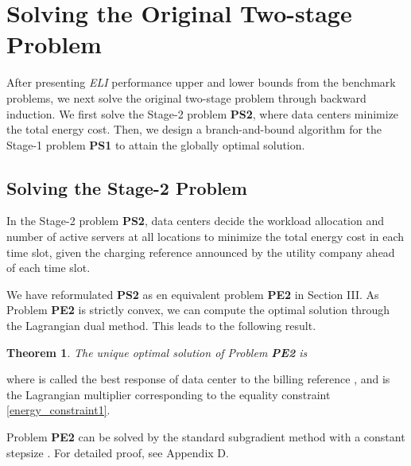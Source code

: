 \documentclass[journal]{IEEEtran}
\newtheorem{theorem}{Theorem}
\begin{document}
	\section{Solving the Original Two-stage Problem}
	After presenting \emph{ELI} performance upper and lower bounds from the benchmark problems, we next solve the original two-stage problem through backward induction. We first solve the Stage-2 problem \textbf{PS2}, where data centers minimize the total energy cost. Then, we design a branch-and-bound algorithm for the Stage-1 problem \textbf{PS1} to attain the globally optimal solution.
	

	\subsection{Solving the Stage-2 Problem}
	In the Stage-2 problem \textbf{PS2}, data centers decide the workload allocation  and number of active servers  at all locations to minimize the total energy cost in each time slot, given the charging reference  announced by the utility company ahead of each time slot. 
	
	We have reformulated \textbf{PS2} as en equivalent problem \textbf{PE2} in Section III. As Problem \textbf{PE2} is strictly convex, we can compute the optimal solution  through the Lagrangian dual method. This leads to the following result.
	\begin{theorem}\label{solve_pe2}
		The unique optimal solution of Problem \textbf{PE2} is
		
	\end{theorem}
	where  is called the best response of data center  to the billing reference , and  is the Lagrangian multiplier corresponding to the equality constraint \eqref{energy_constraint1}. 
	
	Problem \textbf{PE2} can be solved by the standard subgradient method with a constant stepsize \cite{convex}. For detailed proof, see Appendix D.
	
	
\end{document}

